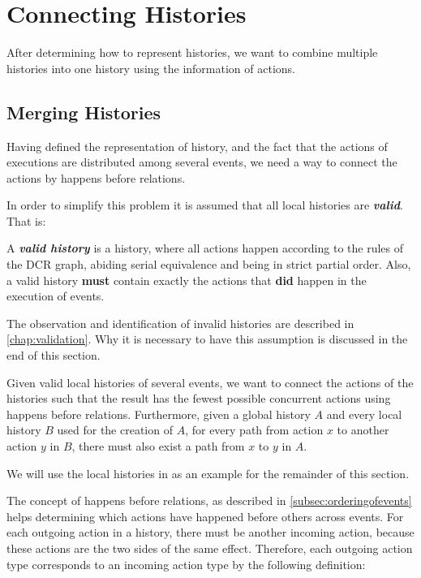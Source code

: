 \chapter{Connecting Histories}\label{chap:connecting-histories}
	After determining how to represent histories, we want to combine multiple histories into one history using the information of actions.
    
    \section{Merging Histories}\label{sec:connecting:merge}
    Having defined the representation of history, and the fact that the actions of executions are distributed among several events, we need a way to connect the actions by happens before relations.

	\newpar In order to simplify this problem it is assumed that all local histories are \textit{\textbf{valid}}. That is:
    
    \begin{definition}
    A \textit{\textbf{valid history}} is a history, where all actions happen according to the rules of the DCR graph, abiding serial equivalence and being in strict partial order. Also, a valid history \textbf{must} contain exactly the actions that \textbf{did} happen in the execution of events.
    \end{definition} 

	\noindent The observation and identification of invalid histories are described in \autoref{chap:validation}. Why it is necessary to have this assumption is discussed in the end of this section.

    \newpar Given valid local histories of several events, we want to connect the actions of the histories such that the result has the fewest possible concurrent actions using happens before relations. Furthermore, given a global history $A$ and every local history $B$ used for the creation of $A$, for every path from action $x$ to another action $y$ in $B$, there must also exist a path from $x$ to $y$ in $A$.
    
    \newpar We will use the local histories in  as an example for the remainder of this section.
    
    \newpar The concept of happens before relations, as described in \autoref{subsec:orderingofevents} helps determining which actions have happened before others across events. For each outgoing action in a history, there must be another incoming action, because these actions are the two sides of the same effect. Therefore, each outgoing action type corresponds to an incoming action type by the following definition:
	

